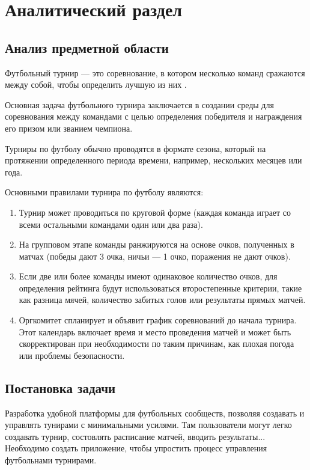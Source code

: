 \section{Аналитический раздел}


\subsection{Анализ предметной области}

Футбольный турнир --- это соревнование, в котором несколько команд сражаются между собой, чтобы определить лучшую из них \cite{raytracin}.

Основная задача футбольного турнира заключается в создании среды для соревнования между командами с целью определения победителя и награждения его призом или званием чемпиона.

Турниры по футболу обычно проводятся в формате сезона, который на протяжении определенного периода времени, например, нескольких месяцев или года.

Основными правилами турнира по футболу являются:
\begin{enumerate}
	\item Турнир может проводиться по круговой форме (каждая команда играет со всеми остальными командами один или два раза).
	\item На групповом этапе команды ранжируются на основе очков, полученных в матчах (победы дают 3 очка, ничьи --- 1 очко, поражения не дают очков).
	\item Если две или более команды имеют одинаковое количество очков, для определения рейтинга будут использоваться второстепенные критерии, такие как разница мячей, количество забитых голов или результаты прямых матчей.
	\item Оргкомитет спланирует и объявит график соревнований до начала турнира. Этот календарь включает время и место проведения матчей и может быть скорректирован при необходимости по таким причинам, как плохая погода или проблемы безопасности.
\end{enumerate}
\subsection{Постановка задачи}
Разработка удобной платформы для футбольных сообществ, позволяя создавать и управлять тунирами с минимальными усилями. Там пользователи могут легко создавать турнир, состовлять расписание матчей, вводить результаты...
Необходимо создать приложение, чтобы упростить процесс управления футбольнами турнирами.

